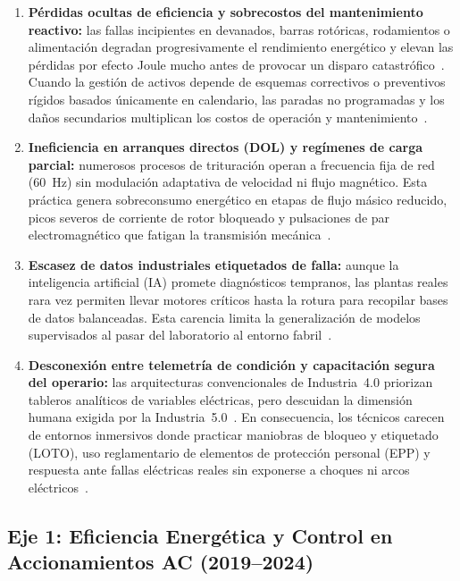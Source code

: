 \begin{enumerate}\setlength{\itemsep}{2pt}\setlength{\topsep}{2pt}
\item \textbf{Pérdidas ocultas de eficiencia y sobrecostos del mantenimiento reactivo:} las fallas incipientes en devanados, barras rotóricas, rodamientos o alimentación degradan progresivamente el rendimiento energético y elevan las pérdidas por efecto Joule mucho antes de provocar un disparo catastrófico~\cite{Garcia2019}. Cuando la gestión de activos depende de esquemas correctivos o preventivos rígidos basados únicamente en calendario, las paradas no programadas y los daños secundarios multiplican los costos de operación y mantenimiento~\cite{Maintenance2023}.
\item \textbf{Ineficiencia en arranques directos (DOL) y regímenes de carga parcial:} numerosos procesos de trituración operan a frecuencia fija de red (\qty{60}{\hertz}) sin modulación adaptativa de velocidad ni flujo magnético. Esta práctica genera sobreconsumo energético en etapas de flujo másico reducido, picos severos de corriente de rotor bloqueado y pulsaciones de par electromagnético que fatigan la transmisión mecánica~\cite{Resa2019,Shabestari2019}.
\item \textbf{Escasez de datos industriales etiquetados de falla:} aunque la inteligencia artificial (IA) promete diagnósticos tempranos, las plantas reales rara vez permiten llevar motores críticos hasta la rotura para recopilar bases de datos balanceadas. Esta carencia limita la generalización de modelos supervisados al pasar del laboratorio al entorno fabril~\cite{Soualhi2022,AI2026}.
\item \textbf{Desconexión entre telemetría de condición y capacitación segura del operario:} las arquitecturas convencionales de Industria~4.0 priorizan tableros analíticos de variables eléctricas, pero descuidan la dimensión humana exigida por la Industria~5.0~\cite{Breque2021,Xu2021}. En consecuencia, los técnicos carecen de entornos inmersivos donde practicar maniobras de bloqueo y etiquetado (LOTO), uso reglamentario de elementos de protección personal (EPP) y respuesta ante fallas eléctricas reales sin exponerse a choques ni arcos eléctricos~\cite{Stefan2023,Stefan2024}.
\end{enumerate}

\subsection{Eje 1: Eficiencia Energética y Control en Accionamientos AC (2019--2024)}\label{subsec:eje1_eficiencia}

